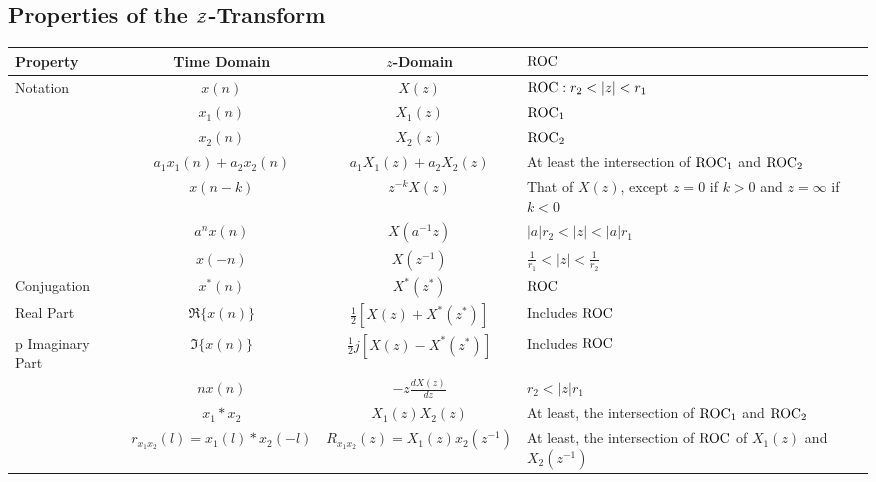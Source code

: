 \subsection{Properties of the \texorpdfstring{$\operatorname{\mathcal{Z}}$-Transform}{Z-Transform}}\label{subsec:Z-Transform Properties}
\begin{table}[h!]
  \centering
  \begin{tabular}{p{4cm}ccp{5cm}}
    \toprule
    Property & Time Domain & $z$-Domain & $\operatorname{\mathrm{ROC}}$ \\
    \midrule
    \multirow{3}{*}{Notation} & $x(n)$ & $X(z)$ & $\operatorname{\mathrm{ROC}}: r_{2} < \lvert z \rvert < r_{1}$ \\
             & $x_{1}(n)$ & $X_{1}(z)$ & $\operatorname{\mathrm{ROC}}_{1}$ \\
             & $x_{2}(n)$ & $X_{2}(z)$ & $\operatorname{\mathrm{ROC}}_{2}$ \\
    \nameref{subsubsec:Z-Transform Linearity} & $a_{1}x_{1}(n) + a_{2}x_{2}(n)$ & $a_{1}X_{1}(z) + a_{2}X_{2}(z)$ & At least the intersection of $\operatorname{\mathrm{ROC}}_{1}$ and $\operatorname{\mathrm{ROC}}_{2}$ \\
    \nameref{subsubsec:Z-Transform Time Shifting} & $x(n-k)$ & $z^{-k}X(z)$ & That of $X(z)$, except $z=0$ if $k>0$ and $z=\infty$ if $k<0$ \\
    \nameref{subsubsec:Z-Domain Scaling} & $a^{n}x(n)$ & $X(a^{-1}z)$ & $\lvert a \rvert r_{2} < \lvert z \rvert < \lvert a \rvert r_{1}$ \\
    \nameref{subsubsec:Z-Transform Time Reversal} & $x(-n)$ & $X(z^{-1})$ & $\frac{1}{r_{1}} < \lvert z \rvert < \frac{1}{r_{2}}$ \\
    Conjugation & $x^{*}(n)$ & $X^{*}(z^{*})$ & $\operatorname{\mathrm{ROC}}$ \\
    Real Part & $\Re \lbrace x(n) \rbrace$ & $\frac{1}{2} \left[ X(z) + X^{*}(z^{*}) \right]$ & Includes $\operatorname{\mathrm{ROC}}$ \\p
    Imaginary Part & $\Im \lbrace x(n) \rbrace$ & $\frac{1}{2} j \left[ X(z) - X^{*}(z^{*}) \right]$ & Includes $\operatorname{\mathrm{ROC}}$ \\
    \nameref{subsubsec:Z-Domain Differentiation} & $nx(n)$ & $-z \frac{dX(z)}{dz}$ & $r_{2} < \lvert z \rvert r_{1}$ \\
    \nameref{subsubsec:Z-Domain Convolutions} & $x_{1} * x_{2}$ & $X_{1}(z)X_{2}(z)$ & At least, the intersection of $\operatorname{\mathrm{ROC}}_{1}$ and $\operatorname{\mathrm{ROC}}_{2}$ \\
    \nameref{subsubsec:Z-Transform 2 Sequence Correlation} & $r_{x_{1}x_{2}}(l) = x_{1}(l) * x_{2}(-l)$ & $R_{x_{1}x_{2}}(z) = X_{1}(z)x_{2}(z^{-1})$ & At least, the intersection of $\operatorname{\mathrm{ROC}}$ of $X_{1}(z)$ and $X_{2}(z^{-1})$ \\

\end{tabular}
\end{table}
